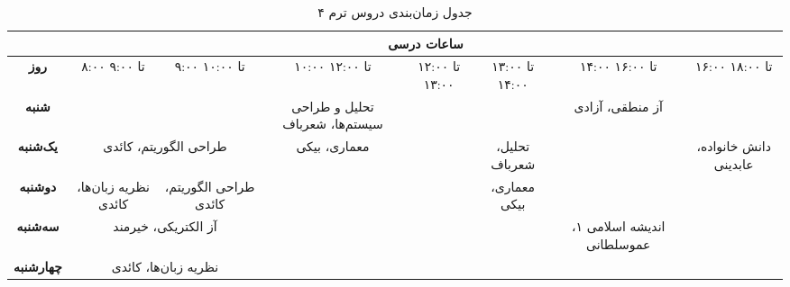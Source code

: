 \documentclass{article}
\begin{document}
	
 	\begin{sidewaystable}[h]
		\begin{center}	
 			\caption{جدول زمان‌بندی دروس ترم ۴}	
			\begin{tabular}{|c|c|c|c|c|c|c|c|c|c|c|}
				\cline{2-11}
				\multicolumn{1}{c}{}
				& \multicolumn{10}{|c|}{\textbf{ساعات درسی}} \\ \hline
			   \textbf{روز} & ۸:۰۰ تا ۹:۰۰ & ۹:۰۰ تا ۱۰:۰۰ &
     			\multicolumn{2}{|c|}{۱۰:۰۰ تا ۱۲:۰۰} &
     			۱۲:۰۰ تا ۱۳:۰۰ & ۱۳:۰۰ تا ۱۴:۰۰ &
				\multicolumn{2}{|c|}{۱۴:۰۰ تا ۱۶:۰۰} &
				\multicolumn{2}{|c|}{۱۶:۰۰ تا ۱۸:۰۰} \\
				\hline
				\hline
				
				\textbf{شنبه} &
				\multicolumn{2}{|c|}{} &
				\multicolumn{2}{|c|}{تحلیل و طراحی سیستم‌ها، شعرباف} &
				\multicolumn{2}{|c|}{} &
				\multicolumn{2}{|c|}{آز منطقی، آزادی} &
				\multicolumn{2}{|c|}{} \\
				\hline
				
				\textbf{یک‌شنبه} &
				\multicolumn{2}{|c|}{طراحی الگوریتم، کائدی} &
				\multicolumn{2}{|c|}{معماری، بیکی} &
				 & تحلیل، شعرباف &
				\multicolumn{2}{|c|}{} &
				\multicolumn{2}{|c|}{دانش خانواده، عابدینی} \\
				\hline
				\textbf{دوشنبه} &
				نظریه زبان‌ها، کائدی & طراحی الگوریتم، کائدی &
				\multicolumn{2}{|c|}{} &
				& معماری، بیکی &
				\multicolumn{2}{|c|}{} &
				\multicolumn{2}{|c|}{} \\
				\hline
				
				\textbf{سه‌شنبه} &
				\multicolumn{2}{|c|}{آز الکتریکی، خیرمند} &
                \multicolumn{2}{|c|}{} &
				\multicolumn{2}{|c|}{} &
				\multicolumn{2}{|c|}{اندیشه اسلامی ۱، عموسلطانی} &
				\multicolumn{2}{|c|}{} \\
				\hline
				
				\textbf{چهارشنبه} &
				\multicolumn{2}{|c|}{نظریه زبان‌ها، کائدی} &
				\multicolumn{2}{|c|}{} &
				\multicolumn{2}{|c|}{} &
				\multicolumn{2}{|c|}{} &
				\multicolumn{2}{|c|}{} \\
				\hline
            \end{tabular}
		\end{center}
 	\end{sidewaystable}
\end{document}
